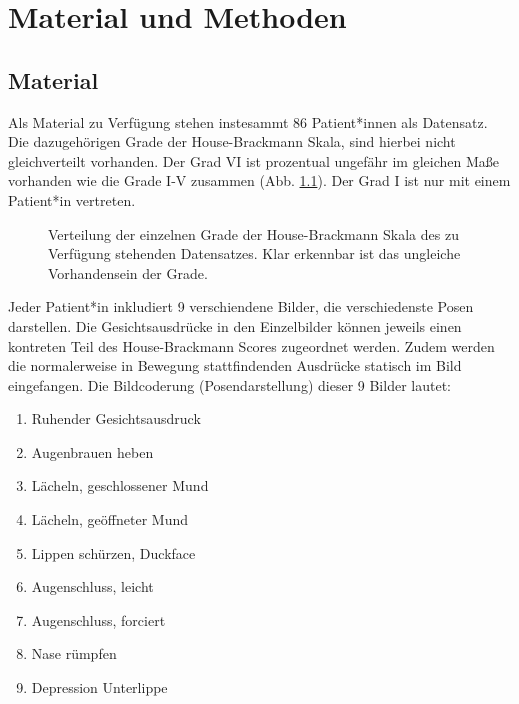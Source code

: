 
\chapter{Material und Methoden}\label{mat_and_method}


\section{Material}\label{material}
Als Material zu Verfügung stehen instesammt 86 Patient*innen als Datensatz. Die dazugehörigen Grade der House-Brackmann Skala, sind hierbei nicht gleichverteilt vorhanden. Der Grad VI ist prozentual ungefähr im gleichen Maße vorhanden wie die Grade I-V zusammen (Abb. \ref{cap:pie_grade}). Der Grad I ist nur mit einem Patient*in vertreten.

\begin{figure}[!b]\centering
{}
\caption[Verteilung der einzelnen Grade der House-Brackmann Skala]{Verteilung der einzelnen Grade der House-Brackmann Skala des zu Verfügung stehenden Datensatzes. Klar erkennbar ist das ungleiche Vorhandensein der Grade.}\label{cap:pie_grade}
\end{figure}\label{fig:pie_grade}


 Jeder Patient*in inkludiert 9 verschiendene Bilder, die verschiedenste Posen darstellen. Die Gesichtsausdrücke in den Einzelbilder können jeweils einen kontreten Teil des House-Brackmann Scores zugeordnet werden. Zudem werden die normalerweise in Bewegung stattfindenden Ausdrücke statisch im Bild eingefangen. Die Bildcoderung (Posendarstellung) dieser 9 Bilder lautet:

\begin{enumerate}
  \setlength\itemsep{-0.6em}
\item Ruhender Gesichtsausdruck
\item Augenbrauen heben
\item Lächeln, geschlossener Mund
\item Lächeln, geöffneter Mund
\item Lippen schürzen, \glqq Duckface\grqq{}
\item Augenschluss, leicht
\item Augenschluss, forciert
\item Nase rümpfen
\item Depression Unterlippe
\end{enumerate}

